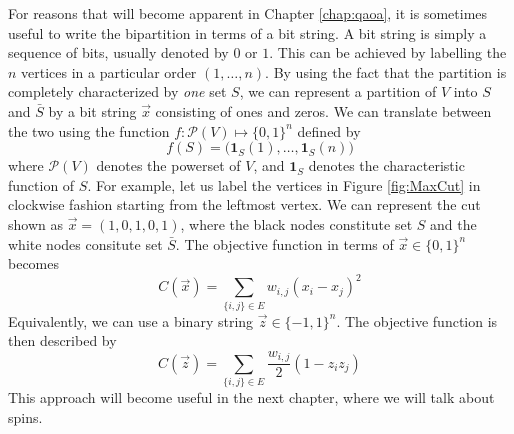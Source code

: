 For reasons that will become apparent in Chapter \ref{chap:qaoa}, it is sometimes useful to write the bipartition in terms of a bit string. A bit string is simply a sequence of bits, usually denoted by $0$ or $1$. This can be achieved by labelling the $n$ vertices in a particular order $(1, \dots, n)$. By using the fact that the partition is completely characterized by \emph{one} set $S$, we can represent a partition of $V$ into $S$ and $\bar{S}$ by a bit string $\vec{x}$ consisting of ones and zeros. We can translate between the two using the function $f: \mathcal{P}(V) \mapsto \{0,1\}^{n}$ defined by
\begin{equation}
	f(S) = \big(\mathbf{1}_S(1), \dots, \mathbf{1}_S(n) \big)
\end{equation}
where $\mathcal{P}(V)$ denotes the powerset of $V$, and $\mathbf{1}_{S}$ denotes the characteristic function of $S$. For example, let us label the vertices in Figure \ref{fig:MaxCut} in clockwise fashion starting from the leftmost vertex. We can represent the cut shown as $\vec{x} = (1,0,1,0,1)$, where the black nodes constitute set $S$ and the white nodes consitute set $\bar{S}$. The objective function in terms of $\vec{x}\in \{0,1\}^n$ becomes
\begin{equation}
C(\vec{x}) = \sum_{\{i,j\} \in E} w_{i,j}(x_i-x_j)^2
\label{eq:maxcut bitstring objective}
\end{equation}
Equivalently, we can use a binary string $\vec{z} \in \{-1,1\}^n$. The objective function is then described by
\begin{equation}
	C(\vec{z}) = \sum_{\{i,j\} \in E}\frac{w_{i,j}}{2}(1-z_iz_j)
\end{equation}
This approach will become useful in the next chapter, where we will talk about spins.

\newpage
